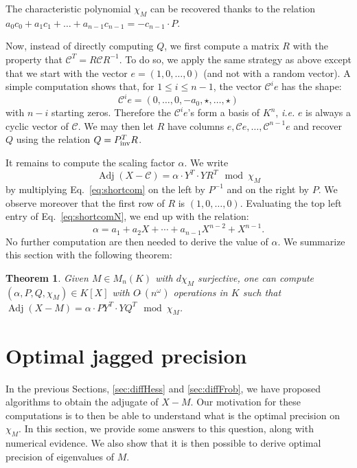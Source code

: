 \documentclass[sigconf]{acmart}
\DeclareMathOperator{\adj}{Adj}
\newcommand{\softO}{O\tilde{~}}
\newcommand{\inv}{\text{\rm inv}}
\newtheorem{theo}{Theorem}[section]
\theoremstyle{definition}
\begin{document}
The characteristic polynomial $\chi_M$ can be recovered thanks to the
relation $a_0c_0 + a_1c_1 + \dots + a_{n-1}c_{n-1} = -c_{n-1} \cdot P$.

Now, instead of directly computing $Q$, we first compute a matrix $R$ 
with the property that $\mathscr{C}^T = R \mathscr{C} R^{-1}$. To do so,
we apply the same strategy as above except that we start with the vector
$e = (1, 0, \ldots, 0)$ (and not with a random vector). A simple computation shows
that, for $1 \leq i \leq n{-}1$, the vector $\mathscr{C}^i e$ has the shape:
$$\mathscr{C}^i e = (0, \ldots, 0, -a_0, \star, \ldots, \star)$$
with $n{-}i$ starting zeros. Therefore the $\mathscr{C}^i e$'s form a basis of
$K^n$, \emph{i.e.} $e$ is always a cyclic vector of $\mathscr{C}$.
We may then let $R$ have columns $e, \mathscr{C}e, \dots, \mathscr{C}^{n-1}e$
and recover $Q$ using the relation $Q = P_\inv^T R$.

It remains to compute the scaling factor $\alpha$. We write
\begin{equation}
\label{eq:shortcomN}
\adj(X{-}\mathscr{C}) = \alpha \cdot Y^T \cdot Y R^T \mod \chi_M
\end{equation}
by multiplying Eq.~\eqref{eq:shortcom} on the 
left by $P^{-1}$ and on the right by $P$. We observe
moreover that the first row of $R$ is $(1, 0, \ldots, 0)$. Evaluating
the top left entry of Eq.~\eqref{eq:shortcomN}, we end up with the 
relation:
$$\alpha = a_1 + a_2 X + \cdots + a_{n-1} X^{n-2} + X^{n-1}.$$
No further computation are then needed to derive the value of $\alpha$.
We summarize this section with the following theorem:

\begin{theo}
\label{thm:compute_shortcom}
Given $M \in M_n(K)$ with $d \chi_M$ surjective,
one can compute $(\alpha, P, Q, \chi_M) \in K[X]$ with
$\softO(n^\omega)$ operations in $K$ such that
$\adj(X{-}M) = \alpha \cdot P Y^T \cdot Y Q^T \mod \chi_M$.
\end{theo}

\section{Optimal jagged precision}
\label{sec:optjagged}

In the previous Sections, \ref{sec:diffHess} and \ref{sec:diffFrob},
we have proposed algorithms to obtain the adjugate of 
$X{-}M.$ Our motivation for these computations is to then
be able to understand what is the optimal precision on $\chi_M.$
In this section, we provide some answers to this question,
along with numerical evidence.
We also show that it is then possible to derive 
optimal precision of eigenvalues of $M.$ 
\end{document}
